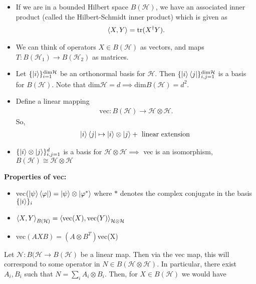 \documentclass[../../note.tex]{subfiles}
\begin{document}
\begin{itemize}
    \item If we are in a bounded Hilbert space $B(\mathcal{H})$, we have an associated inner product (called the Hilbert-Schmidt inner product) which is given as
\begin{align}
    \braket{X,Y}=\text{tr}(X^{\dagger}Y). 
\end{align}
    \item We can think of operators $X\in B(\mathcal{H})$ as vectors, and maps $T:B(\mathcal{H}_1)\rightarrow B(\mathcal{H}_2)$ as matrices. 
    
    \item Let $\{\ket{i}\}_{i=1}^{\text{dim}\mathcal{H}}$ be an orthonormal basis for $\mathcal{H}$. Then $\{\ket{i}\bra{j}\}_{i,j=1}^{\text{dim}\mathcal{H}}$ is a basis for $B(\mathcal{H})$. Note that $\text{dim}\mathcal{H}=d \implies \text{dim}B(\mathcal{H})=d^2$. 
    
    \item Define a linear mapping 
    \begin{align}
        \text{vec}: B(\mathcal{H})\rightarrow \mathcal{H}\otimes \mathcal{H}.
    \end{align}
    So, 
    \begin{align}
        \ket{i}\bra{j} \mapsto \ket{i}\otimes \ket{j} + \text{ linear extension }
    \end{align}
    \item  $\{\ket{i}\otimes \ket{j}\}_{i,j=1}^d$ is a basis for $\mathcal{H} \otimes \mathcal{H} \implies$ vec is an isomorphism, $B(\mathcal{H}) \cong \mathcal{H} \otimes \mathcal{H}$
\end{itemize}
\textbf{Properties of vec:}
\begin{itemize}
    \item vec$(\ket{\psi}\bra{\varphi}) = \ket{\psi} \otimes \ket{{\varphi}^*}$ where $*$ denotes the complex conjugate in the basis $\{\ket{i}\}_i$
    \item $\braket{X,Y}_{B(\mathcal{H})}=\braket{\text{vec}(X),\text{vec}(Y)}_{\mathcal{H}\otimes \mathcal{H}}$
    \item vec$(A X B)=(A\otimes B^{T})$vec(X)
\end{itemize}
Let $\mathcal{N}: B(\mathcal{H}\rightarrow B(\mathcal{H}) $ be a linear map. Then via the vec map, this will correspond to some operator in $N \in B(\mathcal{H}\otimes \mathcal{H})$. In particular, there exist $A_i, B_i$ such that $N=\sum_i A_i \otimes B_i$. Then, for $X\in B(\mathcal{H})$ we would have 
\end{document}
